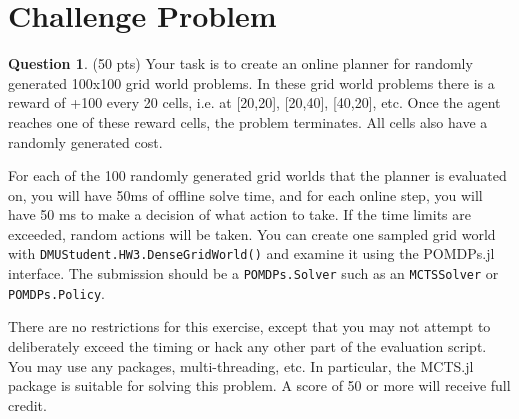 \documentclass{article}
\theoremstyle{definition}
\newtheorem{question}[thm]{Question}
\begin{document}
% 
%     
% 
%     

\section{Challenge Problem}

\begin{question}
    (50 pts) Your task is to create an online planner for randomly generated 100x100 grid world problems. In these grid world problems there is a reward of +100 every 20 cells, i.e. at [20,20], [20,40], [40,20], etc. Once the agent reaches one of these reward cells, the problem terminates. All cells also have a randomly generated cost.

    For each of the 100 randomly generated grid worlds that the planner is evaluated on, you will have 50ms of offline solve time, and for each online step, you will have 50 ms to make a decision of what action to take. If the time limits are exceeded, random actions will be taken. You can create one sampled grid world with \texttt{DMUStudent.HW3.DenseGridWorld()} and examine it using the POMDPs.jl interface. The submission should be a \texttt{POMDPs.Solver} such as an \texttt{MCTSSolver} or \texttt{POMDPs.Policy}.

    There are no restrictions for this exercise, except that you may not attempt to deliberately exceed the timing or hack any other part of the evaluation script. You may use any packages, multi-threading, etc. In particular, the MCTS.jl package is suitable for solving this problem. A score of 50 or more will receive full credit.
\end{question}
\end{document}
